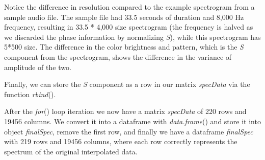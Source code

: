 Notice the difference in resolution compared to the example spectrogram from a sample audio file. The sample file had 33.5 seconds of duration and 8,000 Hz frequency, resulting in 33.5 * 4,000 size spectrogram (the frequency is halved as we discarded the phase information by normalizing \emph{S}), while this spectrogram has 5*500 size. The difference in the color brightness and pattern, which is the \emph{S} component from the spectrogram, shows the difference in the variance of amplitude of the two.

Finally, we can store the \emph{S} component as a row in our matrix \emph{specData} via the function \emph{rbind}().

After the \emph{for}() loop iteration we now have a matrix \emph{specData} of 220 rows and 19456 columns. We convert it into a dataframe with \emph{data.frame}() and store it into object \emph{finalSpec}, remove the first row, and finally we have a dataframe \emph{finalSpec} with 219 rows and 19456 columns, where each row correctly represents the spectrum of the original interpolated data.

